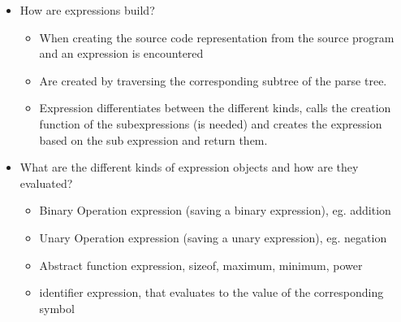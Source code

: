 \begin{itemize}
    \item How are expressions build?
    \begin{itemize}
        \item When creating the source code representation from the source program and an expression is encountered
        \item Are created by traversing the corresponding subtree of the parse tree.
        \item Expression differentiates between the different kinds, calls the creation function of the subexpressions (is needed) and creates the expression based on the sub expression and return them.
    \end{itemize}
    \item What are the different kinds of expression objects and how are they evaluated?
    \begin{itemize}
        \item Binary Operation expression (saving a binary expression), eg. addition
        \item Unary Operation expression (saving a unary expression), eg. negation
        \item Abstract function expression, sizeof, maximum, minimum, power
        \item identifier expression, that evaluates to the value of the corresponding symbol
    \end{itemize} 
\end{itemize}